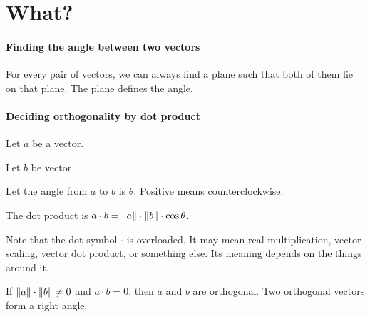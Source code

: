 \section{What?}

\paragraph{Finding the angle between two vectors}

For every pair of vectors,
we can always find a plane such that both of them lie on that plane.
The plane defines the angle.

\paragraph{Deciding orthogonality by dot product}

Let \(a\) be a vector.

Let \(b\) be vector.

Let the angle from \(a\) to \(b\) is \(\theta\). Positive means counterclockwise.

The dot product is \(a \cdot b = \norm{a} \cdot \norm{b} \cdot \cos \theta\).

Note that the dot symbol \(\cdot\) is overloaded.
It may mean real multiplication,
vector scaling,
vector dot product,
or something else.
Its meaning depends on the things around it.

If \(\norm{a} \cdot \norm{b} \neq 0\) and \(a \cdot b = 0\),
then \(a\) and \(b\) are orthogonal.
Two orthogonal vectors form a right angle.
